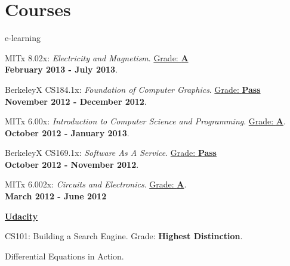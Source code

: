 \section{Courses}
%
e-learning
\begin{outerlist}
\item[] \href{http://www.edxonline.org/}{\edX}%
		\begin{innerlist}
		\item MITx 8.02x: \textit{Electricity and Magnetism}. \href{https://s3.amazonaws.com/verify.edx.org/downloads/ff3a42be25c24842894e6e7b41bf87f5/Certificate.pdf}{Grade: \textbf{A}} \\ \textbf{February 2013 - July 2013}.
		\item BerkeleyX CS184.1x: \textit{Foundation of Computer Graphics}.  \href{https://s3.amazonaws.com/verify.edx.org/downloads/3c023624e80545c88d4dc0c3c8d1a785/Certificate.pdf}{Grade: \textbf{Pass}}\\ \textbf{November 2012 - December 2012}.		
		\item MITx 6.00x: \textit{Introduction to Computer Science and Programming}. \href{https://s3.amazonaws.com/verify.edx.org/downloads/17b57e8344e4469898ebf09779c58d14/Certificate.pdf}{Grade: \textbf{A}}. \\ \textbf{October 2012 - January 2013}.
		\item BerkeleyX CS169.1x: \textit{Software As A Service}. \href{https://s3.amazonaws.com/verify.edx.org/downloads/0883024d432241f6b3f85e5880c10d68/Certificate.pdf}{Grade: \textbf{Pass}}\\ \textbf{October 2012 - November 2012}.		
		\item MITx 6.002x: \textit{Circuits and Electronics}. \href{https://s3.amazonaws.com/verify.edxonline.org/downloads/058c25ccd2b14673955e777c6d51fe82/6002x_Certificate-58332.pdf}{Grade: \textbf{A}}. \\ \textbf{March 2012 - June 2012}
		\end{innerlist}
\end{outerlist}%
\begin{outerlist}
\item[] \href{https://www.udacity.com/}{\textbf{ \textcolor{udacity}{Udacity} }}%
		\begin{innerlist}
		\item CS101: Building a Search Engine. Grade: \textbf{Highest Distinction}.
		\item Differential Equations in Action.
		\end{innerlist}
\end{outerlist}

